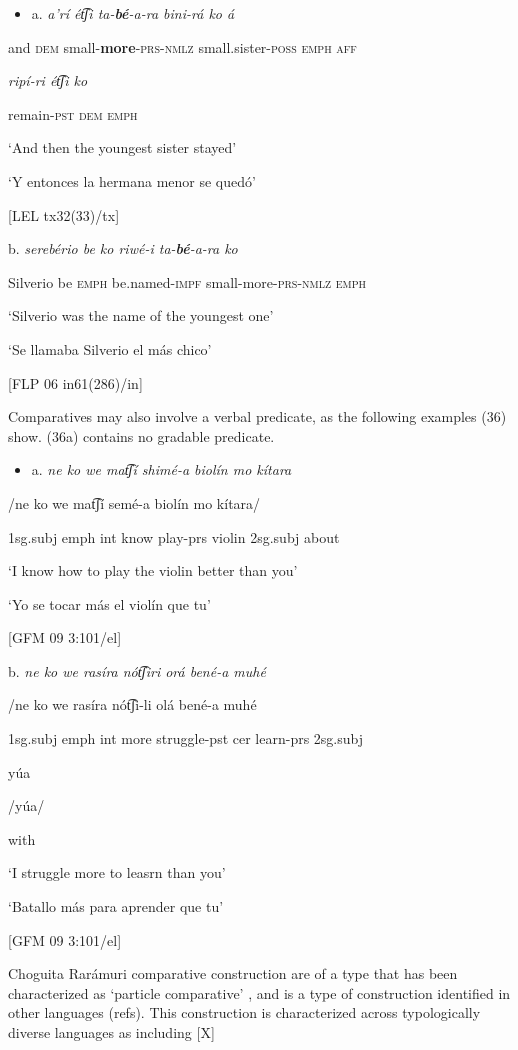 \begin{itemize}
\item a.   \textit{a’rí   ét͡ʃi   ta-}\textbf{\textit{bé}}\textit{{}-a-ra       bini-rá     ko   á} 
\end{itemize}

  and  \textsc{dem} small-\textbf{more}{}-\textsc{prs-nmlz} small.sister-\textsc{poss  emph  aff} 

 \textit{ripí-ri     ét͡ʃi   ko}

 remain-\textsc{pst   dem  emph}

  ‘And then the youngest sister stayed’

  ‘Y entonces la hermana menor se quedó’

  [LEL tx32(33)/tx]

 b.   \textit{serebério   be   ko   riwé-i       ta-}\textbf{\textit{bé}}\textit{{}-a-ra     ko}

  Silverio  be  \textsc{emph}  be.named-\textsc{impf}  small-more-\textsc{prs-nmlz}  \textsc{emph}

  ‘Silverio was the name of the youngest one’

‘Se llamaba Silverio el más chico’

  [FLP 06 in61(286)/in]

Comparatives may also involve a verbal predicate, as the following examples (36) show. (36a) contains no gradable predicate.

\begin{itemize}
\item a.  \textit{ne     ko  we  mat͡ʃí  shimé-a  biolín  mo    kítara}
\end{itemize}

/ne    ko  we  mat͡ʃí  semé-a    biolín  mo    kítara/

1sg.subj  emph  int  know  play-prs  violin  2sg.subj  about

‘I know how to play the violin better than you’

‘Yo se tocar más el violín que tu’

[GFM 09 3:101/el]

  b.  \textit{ne    ko  we  rasíra  nót͡ʃiri    orá  bené-a    muhé}

 /ne    ko  we  rasíra  nót͡ʃi-li  olá  bené-a    muhé  

1sg.subj  emph  int  more  struggle-pst  cer  learn-prs  2sg.subj

yúa

/yúa/

with

‘I struggle more to leasrn than you’

‘Batallo más para aprender que tu’

[GFM 09 3:101/el]

Choguita Rarámuri comparative construction are of a type that has been characterized as ‘particle comparative’ \citealt{stassen1984comparative}, and is a type of construction identified in other  languages (refs). This construction is characterized across typologically diverse languages as including [X]
